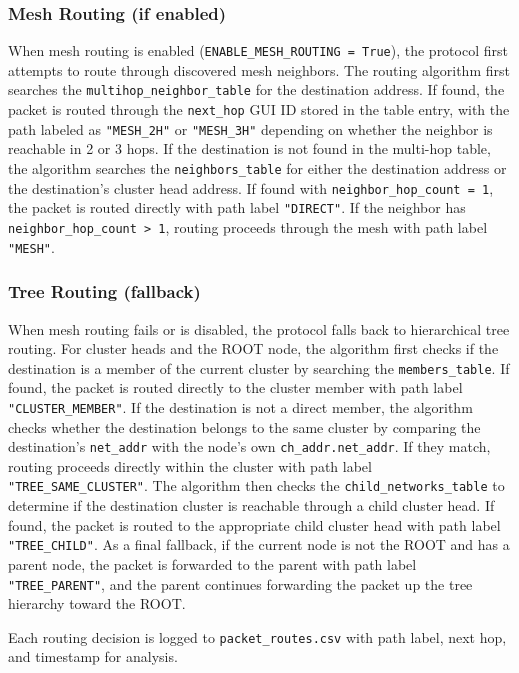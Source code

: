 \documentclass[conference]{IEEEtran}
\begin{document}
\subsubsection{Mesh Routing (if enabled)}
When mesh routing is enabled (\texttt{ENABLE\_MESH\_ROUTING = True}), the protocol first attempts to route through discovered mesh neighbors. The routing algorithm first searches the \texttt{multihop\_neighbor\_table} for the destination address. If found, the packet is routed through the \texttt{next\_hop} GUI ID stored in the table entry, with the path labeled as \texttt{"MESH\_2H"} or \texttt{"MESH\_3H"} depending on whether the neighbor is reachable in 2 or 3 hops. If the destination is not found in the multi-hop table, the algorithm searches the \texttt{neighbors\_table} for either the destination address or the destination's cluster head address. If found with \texttt{neighbor\_hop\_count = 1}, the packet is routed directly with path label \texttt{"DIRECT"}. If the neighbor has \texttt{neighbor\_hop\_count > 1}, routing proceeds through the mesh with path label \texttt{"MESH"}.

\subsubsection{Tree Routing (fallback)}
When mesh routing fails or is disabled, the protocol falls back to hierarchical tree routing. For cluster heads and the ROOT node, the algorithm first checks if the destination is a member of the current cluster by searching the \texttt{members\_table}. If found, the packet is routed directly to the cluster member with path label \texttt{"CLUSTER\_MEMBER"}. If the destination is not a direct member, the algorithm checks whether the destination belongs to the same cluster by comparing the destination's \texttt{net\_addr} with the node's own \texttt{ch\_addr.net\_addr}. If they match, routing proceeds directly within the cluster with path label \texttt{"TREE\_SAME\_CLUSTER"}. The algorithm then checks the \texttt{child\_networks\_table} to determine if the destination cluster is reachable through a child cluster head. If found, the packet is routed to the appropriate child cluster head with path label \texttt{"TREE\_CHILD"}. As a final fallback, if the current node is not the ROOT and has a parent node, the packet is forwarded to the parent with path label \texttt{"TREE\_PARENT"}, and the parent continues forwarding the packet up the tree hierarchy toward the ROOT.

Each routing decision is logged to \texttt{packet\_routes.csv} with path label, next hop, and timestamp for analysis.
\end{document}
